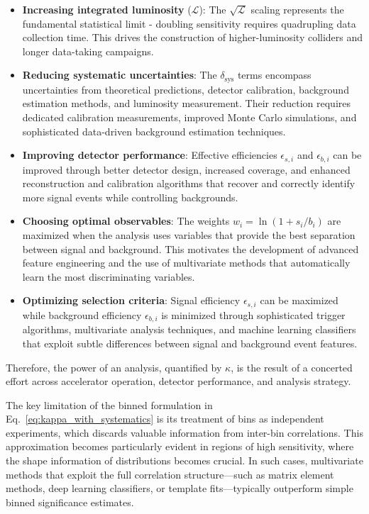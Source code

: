 \begin{itemize}
    \item \textbf{Increasing integrated luminosity} ($\mathcal{L}$): The $\sqrt{\mathcal{L}}$ scaling represents the fundamental statistical limit - doubling sensitivity requires quadrupling data collection time. This drives the construction of higher-luminosity colliders and longer data-taking campaigns.
    
    \item \textbf{Reducing systematic uncertainties}: The $\delta_{\text{sys}}$ terms encompass uncertainties from theoretical predictions, detector calibration, background estimation methods, and luminosity measurement. Their reduction requires dedicated calibration measurements, improved Monte Carlo simulations, and sophisticated data-driven background estimation techniques.

		\item \textbf{Improving detector performance}: Effective efficiencies $\epsilon_{s,i}$ and $\epsilon_{b,i}$ can be improved through better detector design, increased coverage, and enhanced reconstruction and calibration algorithms that recover and correctly identify more signal events while controlling backgrounds.

    \item \textbf{Choosing optimal observables}: The weights $w_i = \ln(1 + s_i/b_i)$ are maximized when the analysis uses variables that provide the best separation between signal and background. This motivates the development of advanced feature engineering and the use of multivariate methods that automatically learn the most discriminating variables.

    \item \textbf{Optimizing selection criteria}: Signal efficiency $\epsilon_{s,i}$ can be maximized while background efficiency $\epsilon_{b,i}$ is minimized through sophisticated trigger algorithms, multivariate analysis techniques, and machine learning classifiers that exploit subtle differences between signal and background event features.

\end{itemize}

Therefore, the power of an analysis, quantified by $\kappa$, is the result of a concerted effort across accelerator operation, detector performance, and analysis strategy.

The key limitation of the binned formulation in Eq.~\ref{eq:kappa_with_systematics} is its treatment of bins as independent experiments, which discards valuable information from inter-bin correlations. This approximation becomes particularly evident in regions of high sensitivity, where the shape information of distributions becomes crucial. In such cases, multivariate methods that exploit the full correlation structure—such as matrix element methods, deep learning classifiers, or template fits—typically outperform simple binned significance estimates.


